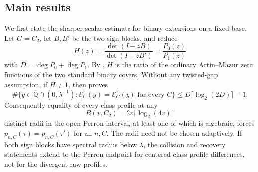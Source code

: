 \subsection{Main results}

We first state the sharper scalar estimate for binary extensions on a fixed base.  Let
\(G=C_2\), let \(B,B'\) be the two sign blocks, and reduce
\[
 H(z)=\frac{\det(I-zB)}{\det(I-zB')}=\frac{P_0(z)}{P_1(z)}
\]
with \(D=\deg P_0+\deg P_1\).  By
, \(H\) is the ratio of the ordinary
Artin--Mazur zeta functions of the two standard binary covers.  Without any
twisted-gap assumption, if \(H\ne1\), then
 proves
\begin{equation}\label{eq:intro-collision-bound}
 \#\{y\in\overline{\mathbb Q}\cap(0,\lambda^{-1}):
   \mathcal E_C^\tau(y)=\mathcal E_C^{\tau'}(y)
   \text{ for every }C\}
 \le D\lceil\log_2(2D)\rceil-1.
\end{equation}
Consequently equality of every class profile at any
\begin{equation}\label{eq:intro-universal-sample-budget}
 B(v,C_2)=2v\lceil\log_2(4v)\rceil
\end{equation}
distinct radii in the open Perron interval, at least one of which is algebraic,
forces
\(p_{n,C}(\tau)=p_{n,C}(\tau')\) for all \(n,C\).  The radii need not be
chosen adaptively.  If both sign blocks have spectral radius below
\(\lambda\), the collision and recovery statements extend to the Perron
endpoint for centered class-profile differences, not for the divergent raw
profiles.

